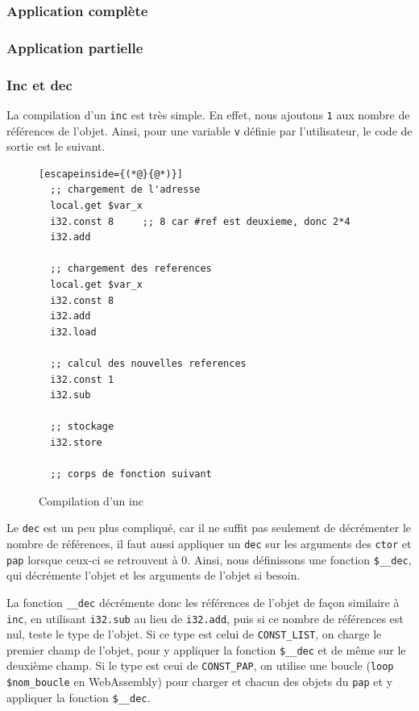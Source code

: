 \documentclass{rapportECL}
\begin{document}
\subsubsection{Application complète}

\subsubsection{Application partielle}

\subsubsection{Inc et dec}

La compilation d'un \verb|inc| est très simple. En effet, nous ajoutons \verb|1| aux nombre de références de l'objet. 
Ainsi, pour une variable \verb|v| définie par l'utilisateur, le code de sortie est le suivant.

\begin{figure}[H]
	\begin{lstlisting}[escapeinside={(*@}{@*)}]
  ;; chargement de l'adresse
  local.get $var_x
  i32.const 8     ;; 8 car #ref est deuxieme, donc 2*4
  i32.add

  ;; chargement des references
  local.get $var_x
  i32.const 8     
  i32.add
  i32.load
   
  ;; calcul des nouvelles references
  i32.const 1
  i32.sub

  ;; stockage
  i32.store

  ;; corps de fonction suivant
	\end{lstlisting}
	\caption{Compilation d'un inc}
	\label{listing:compile_inc}
\end{figure}

Le \verb|dec| est un peu plus compliqué, car il ne suffit pas seulement de décrémenter le nombre de références, il faut aussi 
appliquer un \verb|dec| sur les arguments des \verb|ctor| et \verb|pap| lorsque ceux-ci se retrouvent à 0.
Ainsi, nous définissons une fonction \verb|$__dec|, qui décrémente l'objet et les arguments de l'objet si besoin.

La fonction \verb|__dec| décrémente donc les références de l'objet de façon similaire à \verb|inc|, en utilisant \verb|i32.sub| 
au lieu de \verb|i32.add|, puis si ce nombre de références est nul, teste le type de l'objet. Si ce type est celui de 
\verb|CONST_LIST|, on charge le premier champ de l'objet, pour y appliquer la fonction \verb|$__dec| et de même
sur le deuxième champ. Si le type est ceui de \verb|CONST_PAP|, on utilise une boucle (\verb|loop $nom_boucle| en WebAssembly) pour
charger et chacun des objets du \verb|pap| et y appliquer la fonction \verb|$__dec|.
\end{document}

